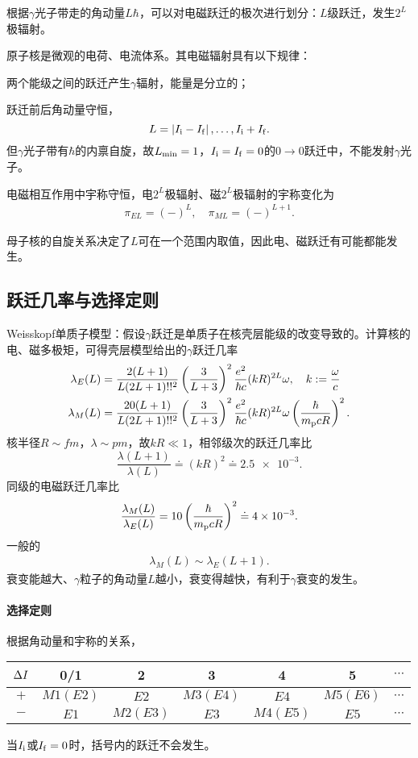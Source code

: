 根据$\gamma$光子带走的角动量$L\hbar$，可以对电磁跃迁的极次进行划分：$L$级跃迁，发生$2^L$极辐射。

原子核是微观的电荷、电流体系。其电磁辐射具有以下规律：
\begin{compactenum}
	\item 两个能级之间的跃迁产生$\gamma$辐射，能量是分立的；
	\item 跃迁前后角动量守恒，
	\[
		L=\left\lvert I_{\mathrm{i}}-I_{\mathrm{f}}\right\rvert,\ldots,I_{\mathrm{i}}+I_{\mathrm{f}}.
	\]
	但$\gamma$光子带有$\hbar$的内禀自旋，故$L_\mathrm{min}=1$，$I_{\mathrm{i}}=I_{\mathrm{f}}=0$的$0\to0$跃迁中，不能发射$\gamma$光子。
	\item 电磁相互作用中宇称守恒，电$2^L$极辐射、磁$2^L$极辐射的宇称变化为
	\begin{align}
		\pi_{EL}=(-)^L,\quad\pi_{ML}=(-)^{L+1}.
	\end{align}
\end{compactenum}
母子核的自旋关系决定了$L$可在一个范围内取值，因此电、磁跃迁有可能都能发生。

\subsection{\textgamma 跃迁几率与选择定则}

Weisskopf单质子模型：假设$\gamma$跃迁是单质子在核壳层能级的改变导致的。计算核的电、磁多极矩，可得壳层模型给出的$\gamma$跃迁几率
\begin{align*}
	\lambda_E(L)&=\frac{2(L+1)}{L(2L+1)!!^2}\left(\frac{3}{L+3}\right)^2\frac{e^2}{\hbar c}(kR)^{2L}\omega,\quad k:=\frac\omega{c}\\
	\lambda_M(L)&=\frac{20(L+1)}{L(2L+1)!!^2}\left(\frac{3}{L+3}\right)^2\frac{e^2}{\hbar c}(kR)^{2L}\omega\left(\frac\hbar{m_\mathrm p cR}\right)^2.
\end{align*}
核半径$R\sim\si{fm}$，$\lambda\sim\si{pm}$，故$kR\ll 1$，相邻级次的跃迁几率比
\[
	\frac{\lambda(L+1)}{\lambda(L)}\doteq(kR)^2\doteq\num{2.5e-3}.
\]
同级的电磁跃迁几率比
\[
	\frac{\lambda_M(L)}{\lambda_E(L)}=10\left(\frac\hbar{m_\mathrm p cR}\right)^2\doteq\num{4e-3}.
\]
一般的
\begin{align}
	\lambda_M(L)\sim\lambda_E(L+1).
\end{align}
衰变能越大、$\gamma$粒子的角动量$L$越小，衰变得越快，有利于$\gamma$衰变的发生。%

\paragraph{选择定则}根据角动量和宇称的关系，
\begin{center}
	\begin{tabular}{ccccccc}
		\toprule
		$\Delta I$&0/1&2&3&4&5&$\cdots$\\
		\midrule
		$+$&$M1(E2)$&$E2$&$M3(E4)$&$E4$&$M5(E6)$&$\cdots$\\
		$-$&$E1$&$M2(E3)$&$E3$&$M4(E5)$&$E5$&$\cdots$\\
		\bottomrule
	\end{tabular}
\end{center}
\begin{remark}
	当$I_{\mathrm{i}}$或$I_{\mathrm{f}}=0$时，括号内的跃迁不会发生。
\end{remark}

